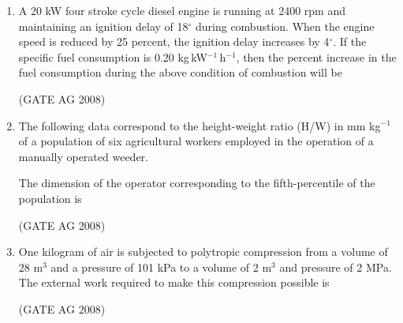\documentclass[journal,12pt,onecolumn]{IEEEtran}
\begin{document}
\begin{enumerate}
\item 
 A 20 kW four stroke cycle diesel engine is running at 2400 rpm and maintaining an ignition delay of 18$^\circ$ during combustion. When the engine speed is reduced by 25 percent, the ignition delay increases by 4$^\circ$. If the specific fuel consumption is 0.20 kg\,kW$^{-1}$\,h$^{-1}$, then the percent increase in the fuel consumption during the above condition of combustion will be
\begin{enumerate}
\end{enumerate}
\hfill(GATE AG 2008)\\

\medskip

\item 
 The following data correspond to the height-weight ratio (H/W) in mm kg$^{-1}$ of a population of six agricultural workers employed in the operation of a manually operated weeder.


The dimension of the operator corresponding to the fifth-percentile of the population is
\begin{enumerate}
\end{enumerate}
\hfill(GATE AG 2008)\\

\medskip

\item 
 One kilogram of air is subjected to polytropic compression from a volume of 28 m$^3$ and a pressure of 101 kPa to a volume of 2 m$^3$ and pressure of 2 MPa. The external work required to make this compression possible is
\begin{enumerate}
\end{enumerate}
\hfill(GATE AG 2008)\\


\end{enumerate}
\end{document}
